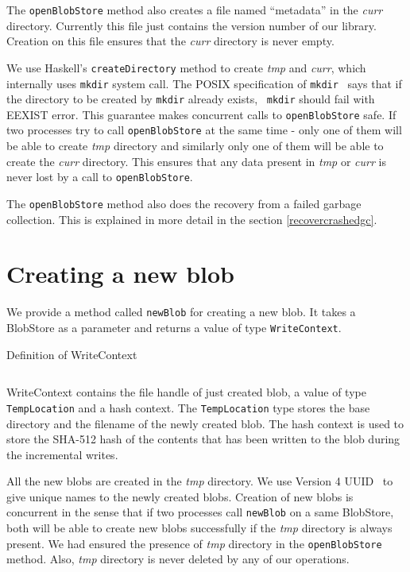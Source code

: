 The \texttt{openBlobStore} method also creates a file named ``metadata'' in the \textit{curr} directory. Currently this file just contains the version
number of our library. Creation on this file ensures that the \textit{curr} directory is never empty.

We use Haskell's \texttt{createDirectory} method to create \textit{tmp} and \textit{curr}, which internally uses \texttt{mkdir} system call.
The POSIX specification of \texttt{mkdir}~\cite{mkdirposix} says that if the directory to be created by \texttt{mkdir} already exists, ~\texttt{mkdir} should fail with EEXIST error.
This guarantee makes concurrent calls to \texttt{openBlobStore} safe. If two processes try to call \texttt{openBlobStore} at the same time - only one of them will be able to create \textit{tmp} directory and similarly only one of them will be able to create the \textit{curr} directory.
This ensures that any data present in \textit{tmp} or \textit{curr} is never lost by a call to \texttt{openBlobStore}.

The \texttt{openBlobStore} method also does the recovery from a failed garbage collection. This is explained in more detail in the section \ref{recovercrashedgc}.

\section{Creating a new blob}
We provide a method called \texttt{newBlob} for creating a new blob. It takes a BlobStore as a parameter and returns a value of type \texttt{WriteContext}.

\begin{program}
  \caption{Definition of WriteContext}
  \label{prog:defwritecontext}
  \inputminted{haskell}{hs/writecontext.hs}
\end{program}

WriteContext contains the file handle of just created blob, a value of type \texttt{TempLocation} and a hash context. The \texttt{TempLocation} type stores the base directory and the filename of the newly created blob. The hash context is used to store the SHA-512 hash of the contents that has been written to the blob during the incremental writes.

All the new blobs are created in the \textit{tmp} directory. We use Version 4 UUID~\cite{leach2005universally} to give unique names to the newly created blobs.
Creation of new blobs is concurrent in the sense that if two processes call \texttt{newBlob} on a same BlobStore, both will be able to create new blobs successfully if the \textit{tmp} directory is always present. We had ensured the presence of \textit{tmp} directory in the \texttt{openBlobStore} method. Also, \textit{tmp} directory is never deleted by any of our operations.

